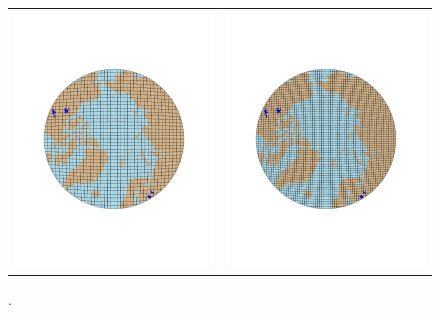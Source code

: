 \documentclass[draft]{agujournal2019}
\begin{document}
\begin{figure}[t]
\begin{center}
\begin{tabular}{cc}
         \includegraphics[width=60mm]{figs/grid-ne30pg2.pdf}&
         \includegraphics[width=60mm]{figs/grid-ne30pg3.pdf} \\
\end{tabular}
\end{center}
\caption{.}
\label{fig:uni-grids}
\end{figure}
\end{document}
